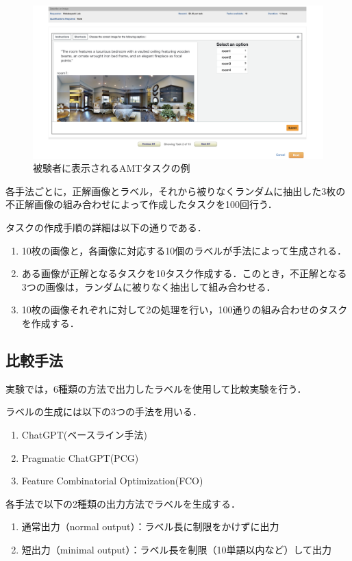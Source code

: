 \documentclass[a4paper,11pt]{jreport}
\begin{document}
\begin{figure}[H]
  \centering
  \includegraphics[width=\linewidth]{figures/amt.png}
  \caption{被験者に表示されるAMTタスクの例}
  \label{fig:amt_example}
\end{figure}

各手法ごとに，正解画像とラベル，それから被りなくランダムに抽出した3枚の不正解画像の組み合わせによって作成したタスクを100回行う．

タスクの作成手順の詳細は以下の通りである．
\begin{enumerate}
  \item 10枚の画像と，各画像に対応する10個のラベルが手法によって生成される．
  \item ある画像が正解となるタスクを10タスク作成する．このとき，不正解となる3つの画像は，ランダムに被りなく抽出して組み合わせる．
  \item 10枚の画像それぞれに対して2の処理を行い，100通りの組み合わせのタスクを作成する．
\end{enumerate}

\subsection{比較手法}

実験では，6種類の方法で出力したラベルを使用して比較実験を行う．

ラベルの生成には以下の3つの手法を用いる．
\begin{enumerate}
    \item ChatGPT(ベースライン手法)
    \item Pragmatic ChatGPT(PCG)
    \item Feature Combinatorial Optimization(FCO)
\end{enumerate}

各手法で以下の2種類の出力方法でラベルを生成する．
\begin{enumerate}
  \item 通常出力（normal output）：ラベル長に制限をかけずに出力
  \item 短出力（minimal output）：ラベル長を制限（10単語以内など）して出力
\end{enumerate}
\end{document}
